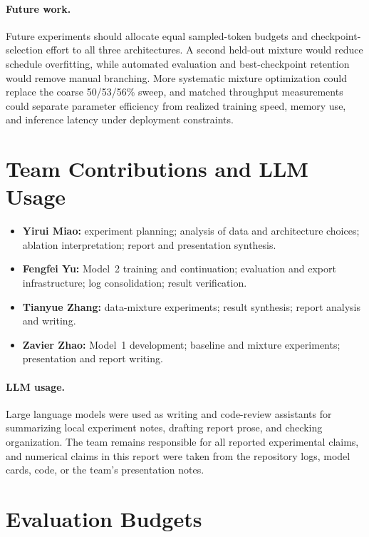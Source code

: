 \documentclass{article}
\begin{document}
\paragraph{Future work.}
Future experiments should allocate equal sampled-token budgets and
checkpoint-selection effort to all three architectures. A second held-out
mixture would reduce schedule overfitting, while automated evaluation and
best-checkpoint retention would remove manual branching. More systematic
mixture optimization could replace the coarse 50/53/56\% sweep, and matched
throughput measurements could separate parameter efficiency from realized
training speed, memory use, and inference latency under deployment constraints.

\section{Team Contributions and LLM Usage}

\begin{itemize}
  \item \textbf{Yirui Miao:} experiment planning; analysis of data and
  architecture choices; ablation interpretation; report and presentation
  synthesis.
  \item \textbf{Fengfei Yu:} Model~2 training and continuation; evaluation and
  export infrastructure; log consolidation; result verification.
  \item \textbf{Tianyue Zhang:} data-mixture experiments; result synthesis;
  report analysis and writing.
  \item \textbf{Zavier Zhao:} Model~1 development; baseline and mixture
  experiments; presentation and report writing.
\end{itemize}

\paragraph{LLM usage.}
Large language models were used as writing and code-review assistants for
summarizing local experiment notes, drafting report prose, and checking
organization. The team remains responsible for all reported experimental
claims, and numerical claims in this report were taken from the repository
logs, model cards, code, or the team's presentation notes.

\clearpage



\clearpage
\appendix

\section{Evaluation Budgets}
\label{app:budgets}
\end{document}
